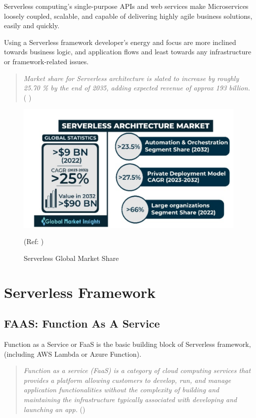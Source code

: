 \documentclass{article}
\begin{document}
\begin{flushleft}
Serverless computing's single-purpose APIs and web services make Microservices loosely coupled, scalable, and capable of delivering highly agile business solutions, easily and quickly.

Using a Serverless framework developer’s energy and focus are more inclined towards business logic, and application flows and least towards any infrastructure or framework-related issues.
\end{flushleft}
\begin{quote}
   \textit{Market share for Serverless architecture is slated to increase by roughly 25.70 \% by the end of 2035, adding expected revenue of approx 193 billion. }  ( \cite{GMI_3796_2022} )
\end{quote}

\begin{figure}[h]
    \centering
    \includegraphics[width=0.5\linewidth]{images/Serverless-Arch-market.PNG}
    \caption{Serverless Global Market Share}
    \label{Serverless_global_market_share}
    (Ref: \cite{GMI_3796_2022} )
\end{figure}

\pagebreak

\section{Serverless Framework}
\subsection{FAAS: Function As A Service}
\par
\justifying
Function as a Service or FaaS is the basic building block of Serverless framework, (including AWS Lambda or Azure Function). 
\begin{quote}
\begin{flushleft}
\textit{Function as a service (FaaS) is a category of cloud computing services that provides a platform allowing customers to develop, run, and manage application functionalities without the complexity of building and maintaining the infrastructure typically associated with developing and launching an app.}
\hfill \break
(\cite{Wiki_function_as_a_service})
\end{flushleft}
\end{quote}
\end{document}

